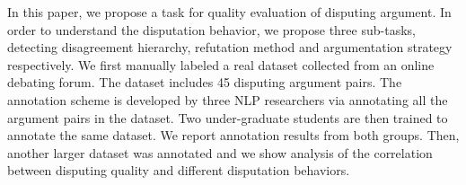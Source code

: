 In this paper, we propose a task for quality evaluation of disputing argument. In order to understand the disputation behavior, we propose three sub-tasks, detecting disagreement hierarchy, refutation method and argumentation strategy respectively. We first manually labeled a real dataset collected from an online debating forum. The dataset includes 45 disputing argument pairs. The annotation scheme is developed by three NLP researchers via annotating all the argument pairs in the dataset. Two under-graduate students are then trained to annotate the same dataset. We report annotation results from both groups. Then, another larger dataset was annotated and we show analysis of the correlation between disputing quality and different disputation behaviors.

